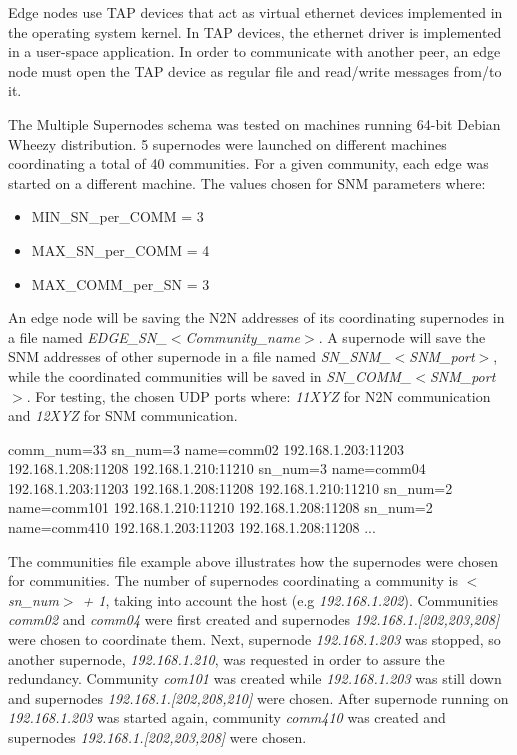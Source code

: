 
Edge nodes use TAP \cite{tuntap} devices that act as virtual ethernet devices implemented in the operating system kernel. In TAP devices, the ethernet driver is implemented in a user-space application. In order to communicate with another peer, an edge node must open the TAP device as regular file and read/write messages from/to it. 

The Multiple Supernodes schema was tested on machines running 64-bit Debian Wheezy distribution. 5 supernodes were launched on different machines coordinating a total of 40 communities. For a given community, each edge was started on a different machine.
The values chosen for SNM parameters where:

\begin{itemize}
\item MIN_SN_per_COMM = 3
\item MAX_SN_per_COMM = 4
\item MAX_COMM_per_SN = 3
\end{itemize}

An edge node will be saving the N2N addresses of its coordinating supernodes in a file named \emph{EDGE_SN_$<$Community_name$>$}. A supernode will save the SNM addresses of other supernode in a file named \emph{SN_SNM_$<$SNM_port$>$}, while the coordinated communities will be saved in \emph{SN_COMM_$<$SNM_port$>$}. For testing, the chosen UDP ports where: \emph{11XYZ} for N2N communication and \emph{12XYZ} for SNM communication.

\begin{file-content}[caption={Communities file \emph{SN_COMM_12003} for supernode listening on \emph{192.168.0.3:11003}}]
comm_num=33
sn_num=3 name=comm02
	192.168.1.203:11203
	192.168.1.208:11208
	192.168.1.210:11210
sn_num=3 name=comm04
	192.168.1.203:11203
	192.168.1.208:11208
	192.168.1.210:11210
sn_num=2 name=comm101
	192.168.1.210:11210
	192.168.1.208:11208
sn_num=2 name=comm410
	192.168.1.203:11203
	192.168.1.208:11208
...
\end{file-content}

The communities file example above illustrates how the supernodes were chosen for communities. The number of supernodes coordinating a community is \emph{$<$sn_num$>$ + 1}, taking into account the host (e.g \emph{192.168.1.202}).
Communities \emph{comm02} and \emph{comm04} were first created and supernodes \emph{192.168.1.[202,203,208]} were chosen to coordinate them. Next, supernode \emph{192.168.1.203} was stopped, so another supernode, \emph{192.168.1.210}, was requested in order to assure the redundancy. Community \emph{com101} was created while \emph{192.168.1.203} was still down and supernodes \emph{192.168.1.[202,208,210]} were chosen. After supernode running on \emph{192.168.1.203} was started again, community \emph{comm410} was created and supernodes \emph{192.168.1.[202,203,208]} were chosen.